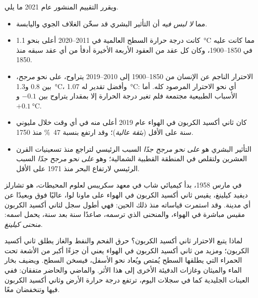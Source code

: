 ويقرر التقييم المنشور عام 2021 ما يلي.
\begin{itemize}
  \item مما \emph{لا لبس فيه} أن التأثير البشري قد سخّن الغلاف الجوي
         واليابسة.
  \item كانت درجة حرارة السطح العالمية في 2011--2020 أعلى بنحو
        \qty{1.1}{\degreeCelsius} مما كانت عليه في 1850--1900، وكان كل عقد
        من العقود الأربعة الأخيرة أدفأ من أي عقد سبقه منذ
        1850.
  \item الاحترار الناجم عن الإنسان من 1850--1900 إلى 2010--2019 يتراوح،
        على نحو \emph{مرجح}، بين 0.8 و\qty{1.3}{\degreeCelsius}، وأفضل
        تقدير له \qty{1.07}{\degreeCelsius}: أي نحو الاحترار المرصود كله.
        أما الأسباب الطبيعية مجتمعة فلم تغير درجة الحرارة إلا بمقدار
        يتراوح بين $-0.1$ و$+\qty{0.1}{\degreeCelsius}$.
  \item كان ثاني أكسيد الكربون في الهواء عام 2019 أعلى منه في أي وقت
        خلال مليوني سنة على الأقل (\emph{بثقة عالية})؛ وقد ارتفع بنسبة
        47~\% منذ 1750.
  \item التأثير البشري هو \emph{على نحو مرجح جدًا} السبب الرئيسي لتراجع
         منذ تسعينيات القرن العشرين ولتقلص  في
        المنطقة القطبية الشمالية؛ وهو \emph{على نحو مرجح جدًا} السبب الرئيسي
        لارتفاع البحر منذ 1971 على الأقل.
\end{itemize}

\begin{history}
في مارس 1958، بدأ كيميائي شاب في معهد سكريبس لعلوم المحيطات، هو تشارلز ديفيد
كيلينغ، يقيس ثاني أكسيد الكربون في الهواء على ماونا لوا، عاليًا فوق 
وبعيدًا عن أي مدينة. وقد استمرت قياساته منذ ذلك الحين: فهي أطول سجل لثاني أكسيد
الكربون مقيس مباشرة في الهواء، والمنحنى الذي ترسمه، صاعدًا سنة بعد سنة، يحمل
اسمه: \emph{منحنى كيلينغ}.
\end{history}

لماذا يتبع الاحترار ثاني أكسيد الكربون؟ حرق الفحم والنفط والغاز يطلق ثاني أكسيد
الكربون؛ ومزيد من ثاني أكسيد الكربون في الهواء يعني أن جزءًا أكبر من الأشعة تحت
الحمراء التي يطلقها السطح يُمتص ويُعاد نحو الأسفل، فيسخن السطح. ويضيف بخار
الماء والميثان وغازات الدفيئة الأخرى إلى هذا الأثر. والماضي والحاضر متفقان:
ففي العينات الجليدية كما في سجلات اليوم، ترتفع درجة حرارة الأرض وثاني أكسيد
الكربون فيها وتنخفضان معًا.

